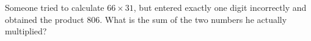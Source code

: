 Someone tried to calculate $66\times31$, but entered exactly one digit incorrectly and obtained the product $806$. What is the sum of the two numbers he actually multiplied?

